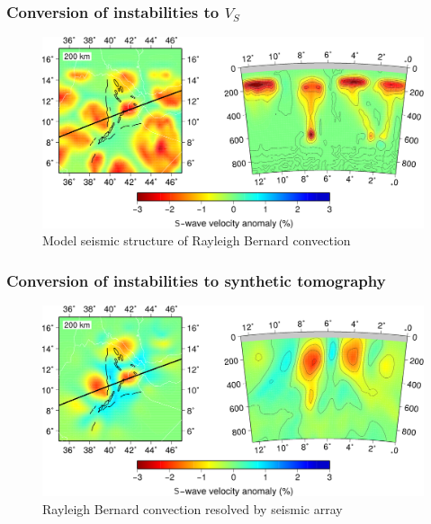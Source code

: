 \documentclass[aspectratio=169]{beamer}
\begin{document}
\begin{frame}
    \frametitle{Conversion of instabilities to $V_{S}$}
    \begin{figure}
        \includegraphics[width=0.85\paperwidth]{./figures/Newt200/input.png}
        \caption{Model seismic structure of Rayleigh Bernard convection}
    \end{figure}
\end{frame}

\begin{frame}
    \frametitle{Conversion of instabilities to synthetic tomography}
    \begin{figure}
        \includegraphics[width=0.85\paperwidth]{./figures/Newt200/output_damp.png}
        \caption{Rayleigh Bernard convection resolved by seismic array}
    \end{figure}
\end{frame}
\end{document}
